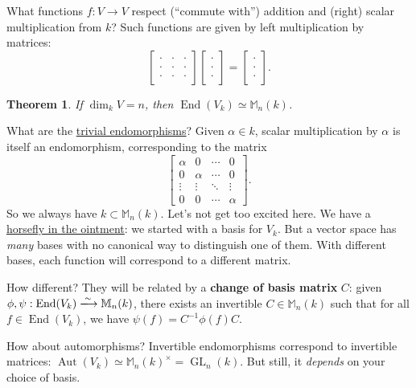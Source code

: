 \documentclass[12pt]{article}
\newcommand{\ita}[1]{\textit{#1}}
\newtheorem{theorem}{Theorem}[section]
\theoremstyle{definition}
\DeclareMathOperator\Aut{Aut}
\DeclareMathOperator\End{End}
\newcommand{\m}{\mathbb{M}}
\DeclareMathOperator\GL{GL}
\begin{document}
What functions $f:V\to V$ respect (``commute with'') addition and (right) scalar multiplication from $k$? Such functions are given by left multiplication by matrices:
\begin{equation}
    \begin{bmatrix}
        \cdot & \cdot & \cdot \\
        \cdot & \cdot & \cdot \\
        \cdot & \cdot & \cdot 
    \end{bmatrix}
    \begin{bmatrix}
        \cdot \\
        \cdot \\
        \cdot
    \end{bmatrix}
    =
    \begin{bmatrix}
        \cdot \\
        \cdot \\
        \cdot 
    \end{bmatrix}.
\end{equation}
\begin{theorem}
    If $\dim_kV=n$, then $\End(V_k)\simeq\m_n(k)$.
\end{theorem}
What are the \underline{trivial endomorphisms}? Given $\alpha\in k$, scalar multiplication by $\alpha$ is itself an endomorphism, corresponding to the matrix
\begin{equation}
    \begin{bmatrix}
        \alpha & 0 & \cdots & 0 \\
        0 & \alpha & \cdots & 0 \\
        \vdots  & \vdots  & \ddots & \vdots  \\
        0 & 0 & \cdots & \alpha 
    \end{bmatrix}.
\end{equation}
So we always have $k\subset\m_n(k)$.
Let's not get too excited here. We have a \underline{horsefly in the ointment}: we started with a basis for $V_k$. But a vector space has \ita{many} bases with no canonical way to distinguish one of them. With different bases, each function will correspond to a different matrix.

How different? They will be related by a \textbf{change of basis matrix} $C$: given $\phi,\psi:\End(V_k)\xlongrightarrow{\sim}\m_n(k)$, there exists an invertible $C\in\m_n(k)$ such that for all $f\in\End(V_k)$, we have $\psi(f)=C^{-1}\phi(f)C$.

How about automorphisms? Invertible endomorphisms correspond to invertible matrices: $\Aut(V_k)\simeq\m_n(k)^{\times}=\GL_n(k)$. But still, it \ita{depends} on your choice of basis.
\end{document}
